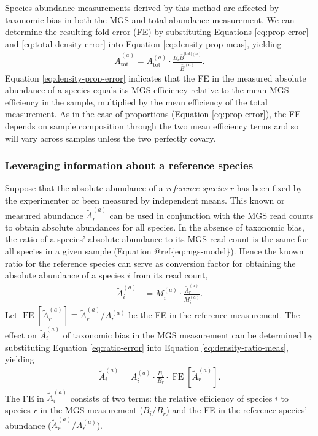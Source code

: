 \documentclass[
]{article}
\begin{document}
Species abundance measurements derived by this method are affected by taxonomic bias in both the MGS and total-abundance measurement.
We can determine the resulting fold error (FE) by substituting Equations \eqref{eq:prop-error} and \eqref{eq:total-density-error} into Equation \eqref{eq:density-prop-meas}, yielding
\begin{align}
  \label{eq:density-prop-error}
  \tilde A_{\text{tot}}^{(a)}
  = A_{\text{tot}}^{(a)} \cdot \frac{B_i \bar B^{{\text{[tot]}}(a)}}{\bar B^{(a)}}.
\end{align}
Equation \eqref{eq:density-prop-error} indicates that the FE in the measured absolute abundance of a species equals its MGS efficiency relative to the mean MGS efficiency in the sample, multiplied by the mean efficiency of the total measurement.
As in the case of proportions (Equation \eqref{eq:prop-error}), the FE depends on sample composition through the two mean efficiency terms and so will vary across samples unless the two perfectly covary.

\hypertarget{leveraging-information-about-a-reference-species}{%
\subsubsection{Leveraging information about a reference species}\label{leveraging-information-about-a-reference-species}}

Suppose that the absolute abundance of a \emph{reference species} \(r\) has been fixed by the experimenter or been measured by independent means.
This known or measured abundance \(\tilde A_{r}^{(a)}\) can be used in conjunction with the MGS read counts to obtain absolute abundances for all species.
In the absence of taxonomic bias, the ratio of a species' absolute abundance to its MGS read count is the same for all species in a given sample (Equation @ref\{eq:mgs-model\}).
Hence the known ratio for the reference species can serve as conversion factor for obtaining the absolute abundance of a species \(i\) from its read count,
\begin{align}
  \label{eq:density-ratio-meas}
  \tilde A_i^{(a)} &= M_i^{(a)} \cdot \frac{\tilde A_{r}^{(a)}}{M_i^{(a)}}.
\end{align}
Let \(\mathop{\mathrm{FE}}[\tilde A_r^{(a)}] \equiv {\tilde A_r^{(a)}}/{A_r^{(a)}}\) be the FE in the reference measurement.
The effect on \(\tilde A_i^{(a)}\) of taxonomic bias in the MGS measurement can be determined by substituting Equation \eqref{eq:ratio-error} into Equation \eqref{eq:density-ratio-meas}, yielding
\begin{align}
  \label{eq:density-ratio-error}
  \tilde A_i^{(a)} = A_i^{(a)} \cdot \frac{B_i}{B_r} \cdot 
    \mathop{\mathrm{FE}}\left[\tilde A_r^{(a)}\right].
\end{align}
The FE in \(\tilde A_i^{(a)}\) consists of two terms: the relative efficiency of species \(i\) to species \(r\) in the MGS measurement (\({B_i}/{B_r}\)) and the FE in the reference species' abundance (\({\tilde A_r^{(a)}}/{A_r^{(a)}}\)).
\end{document}
